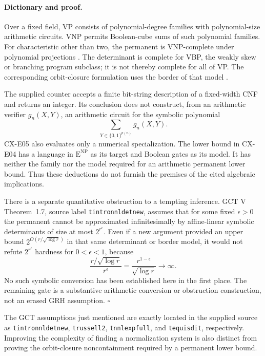\paragraph{Dictionary and proof.}
Over a fixed field, VP consists of polynomial-degree families with
polynomial-size arithmetic circuits. VNP permits Boolean-cube sums
of such polynomial families.
For characteristic other than two, the permanent is VNP-complete
under polynomial projections
\cite[Theorem~2, p.254]{Valiant1979}.
The determinant is complete for VBP, the weakly skew or branching
program subclass; it is not thereby complete for all of VP.
The corresponding orbit-closure formulation uses the border of
that model
\cite[Definitions~2.9, 2.25; Theorems~2.20, 2.29, 7.3]{Burgisser2024}.

The supplied counter accepts a finite bit-string description of a
fixed-width CNF and returns an integer.
Its conclusion does not construct, from an arithmetic verifier
\(g_n(X,Y)\), an arithmetic circuit for the symbolic polynomial
\[
 \sum_{Y\in\{0,1\}^{p(n)}}g_n(X,Y).
\]
CX-E05 also evaluates only a numerical specialization.
The lower bound in CX-E04 has a language in
\(\mathrm E^{\mathrm{NP}}\) as its target and Boolean gates as its
model. It has neither the family nor the model required for an
arithmetic permanent lower bound.
Thus these deductions do not furnish the premises of the cited
algebraic implications.

There is a separate quantitative obstruction to a tempting inference.
GCT V Theorem~1.7, source label \texttt{tintronnldetnew}, assumes
that for some fixed \(\epsilon>0\) the permanent cannot be approximated
infinitesimally by affine-linear symbolic determinants of size
at most \(2^{r^\epsilon}\).
Even if a new argument provided an upper bound
\(2^{O(r/\sqrt{\log r})}\) in that same determinant or border model,
it would not refute
\(2^{r^\epsilon}\) hardness for \(0<\epsilon<1\), because
\[
 \frac{r/\sqrt{\log r}}{r^\epsilon}
 =\frac{r^{1-\epsilon}}{\sqrt{\log r}}\longrightarrow\infty.
\]
No such symbolic conversion has been established here in the first
place.
The remaining gate is a substantive arithmetic conversion or
obstruction construction, not an erased GRH assumption.
\hfill\(\square\)

The GCT assumptions just mentioned are exactly located in the supplied
source as \texttt{tintronnldetnew}, \texttt{trussell2},
\texttt{tnnlexpfull}, and \texttt{tequisdit}, respectively.
Improving the complexity of finding a normalization system is also
distinct from proving the orbit-closure noncontainment required by a
permanent lower bound.

